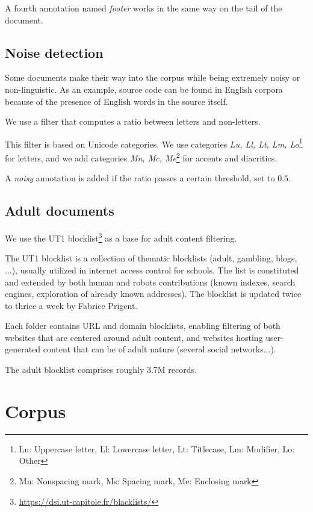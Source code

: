A fourth annotation named \emph{footer} works in the same way on the tail of the document.

\subsection{Noise detection}

Some documents make their way into the corpus while being extremely noisy or non-linguistic. As an example, source code can be found in English corpora because of the presence of English words in the source itself.

We use a filter that computes a ratio between letters and non-letters.

This filter is based on Unicode categories. We use categories \emph{Lu, Ll, Lt, Lm, Lo}\footnote{Lu: Uppercase letter, Ll: Lowercase letter, Lt: Titlecase, Lm: Modifier, Lo: Other} for letters, and we add categories \emph{Mn, Mc, Me}\footnote{Mn: Nonspacing mark, Ms: Spacing mark, Me: Enclosing mark} for accents and diacritics.

A \emph{noisy} annotation is added if the ratio passes a certain threshold, set to $0.5$.


\subsection{Adult documents}

We use the UT1 blocklist\footnote{\url{https://dsi.ut-capitole.fr/blacklists/}} as a base for adult content filtering.

The UT1 blocklist is a collection of thematic blocklists (adult, gambling, blogs, ...), usually utilized in internet access control for schools. The list is constituted and extended by both human and robots contributions (known indexes, search engines, exploration of already known addresses). The blocklist is updated twice to thrice a week by Fabrice Prigent.

Each folder contains URL and domain blocklists, enabling filtering of both websites that are centered around adult content, and websites hosting user-generated content that can be of adult nature (several social networks...).

The adult blocklist comprises roughly 3.7M records.


\section{Corpus}

